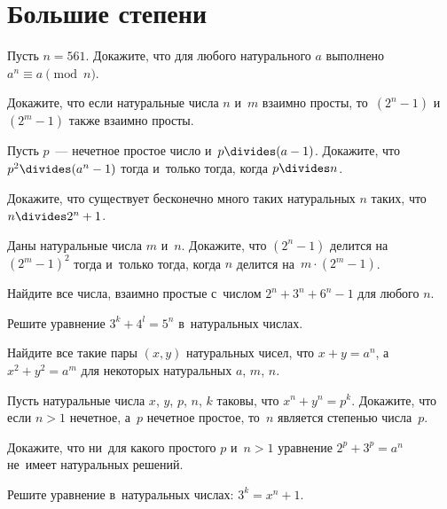 

\section*{Большие степени}


\begin{problems}

\item
Пусть $n = 561$.
Докажите, что для любого натурального $a$ выполнено $a^n \equiv a \pmod{n}$.

\item
Докажите, что если натуральные числа $n$ и~$m$ взаимно просты, то~$(2^n - 1)$
и~$(2^m - 1)$ также взаимно просты.

\item
Пусть $p$~— нечетное простое число и~$p \divides (a - 1)$.
Докажите, что $p^2 \divides (a^n - 1)$ тогда и~только тогда, когда $p \divides n$.

\item
Докажите, что существует бесконечно много таких натуральных $n$ таких, что
$n \divides 2^n + 1$.

\item
Даны натуральные числа $m$ и~$n$.
Докажите, что $(2^n - 1)$ делится на~$(2^m - 1)^2$ тогда и~только тогда, когда
$n$ делится на~$m \cdot (2^m - 1)$.

\item
Найдите все числа, взаимно простые с~числом $2^n + 3^n + 6^n - 1$ для
любого $n$.

\item
Решите уравнение $3^k + 4^l = 5^n$ в~натуральных числах.

\item
Найдите все такие пары $(x, y)$ натуральных чисел, что $x + y = a^n$,
а~$x^2 + y^2 = a^m$ для некоторых натуральных $a$, $m$, $n$.

\item
Пусть натуральные числа $x$, $y$, $p$, $n$, $k$ таковы, что $x^n + y^n = p^k$.
Докажите, что если $n > 1$ нечетное, а~$p$ нечетное простое, то~$n$ является
степенью числа~$p$.

\item
Докажите, что ни~для какого простого $p$ и~$n > 1$ уравнение $2^p + 3^p = a^n$
не~имеет натуральных решений.

\item
Решите уравнение в~натуральных числах: $3^k = x^n + 1$.

\end{problems}

